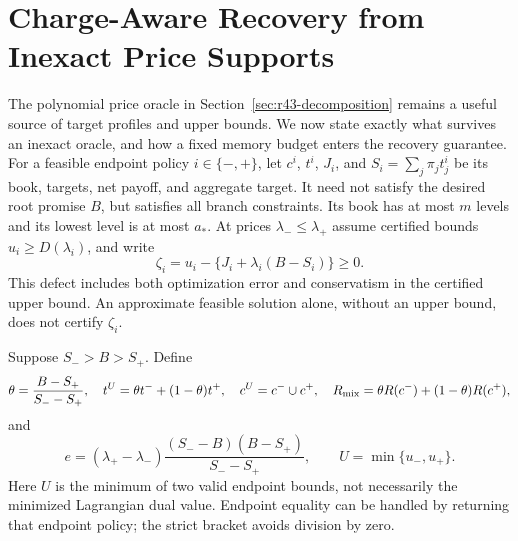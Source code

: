 \section{Charge-Aware Recovery from Inexact Price Supports}\label{sec:r45-support}
The polynomial price oracle in Section~\ref{sec:r43-decomposition} remains a useful source of target profiles and upper bounds. We now state exactly what survives an inexact oracle, and how a fixed memory budget enters the recovery guarantee. For a feasible endpoint policy $i\in\{-,+\}$, let $c^i$, $t^i$, $J_i$, and $S_i=\sum_j\pi_jt_j^i$ be its book, targets, net payoff, and aggregate target. It need not satisfy the desired root promise $B$, but satisfies all branch constraints. Its book has at most $m$ levels and its lowest level is at most $a_*$. At prices $\lambda_-\leq\lambda_+$ assume certified bounds $u_i\geq D(\lambda_i)$, and write
\begin{equation}\label{eq:r45-zeta}
 \zeta_i=u_i-\{J_i+\lambda_i(B-S_i)\}\geq0.
\end{equation}
This defect includes both optimization error and conservatism in the certified upper bound. An approximate feasible solution alone, without an upper bound, does not certify $\zeta_i$.

Suppose $S_->B>S_+$. Define
\[
 \theta=\frac{B-S_+}{S_--S_+},\quad
 t^U=\theta t^-+(1-\theta)t^+,\quad c^U=c^-\cup c^+,
 \quad R_{\rm mix}=\theta R(c^-)+(1-\theta)R(c^+),
\]
and
\begin{equation}\label{eq:r45-e}
 e=(\lambda_+-\lambda_-)\frac{(S_--B)(B-S_+)}{S_--S_+},
 \qquad U=\min\{u_-,u_+\}.
\end{equation}
Here $U$ is the minimum of two valid endpoint bounds, not necessarily the minimized Lagrangian dual value. Endpoint equality can be handled by returning that endpoint policy; the strict bracket avoids division by zero.

